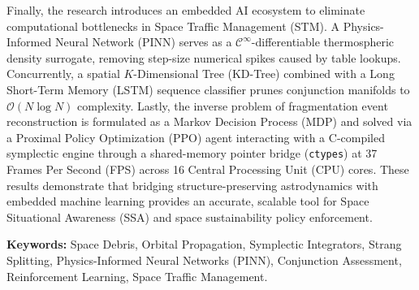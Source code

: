 Finally, the research introduces an embedded AI ecosystem to eliminate computational bottlenecks in Space Traffic Management (STM). A Physics-Informed Neural Network (PINN) serves as a $\mathcal{C}^\infty$-differentiable thermospheric density surrogate, removing step-size numerical spikes caused by table lookups. Concurrently, a spatial $K$-Dimensional Tree (KD-Tree) combined with a Long Short-Term Memory (LSTM) sequence classifier prunes conjunction manifolds to $\mathcal{O}(N \log N)$ complexity. Lastly, the inverse problem of fragmentation event reconstruction is formulated as a Markov Decision Process (MDP) and solved via a Proximal Policy Optimization (PPO) agent interacting with a C-compiled symplectic engine through a shared-memory pointer bridge (\texttt{ctypes}) at 37 Frames Per Second (FPS) across 16 Central Processing Unit (CPU) cores. These results demonstrate that bridging structure-preserving astrodynamics with embedded machine learning provides an accurate, scalable tool for Space Situational Awareness (SSA) and space sustainability policy enforcement.

\vspace{0.8cm}
\noindent\textbf{Keywords:} Space Debris, Orbital Propagation, Symplectic Integrators, Strang Splitting, Physics-Informed Neural Networks (PINN), Conjunction Assessment, Reinforcement Learning, Space Traffic Management.